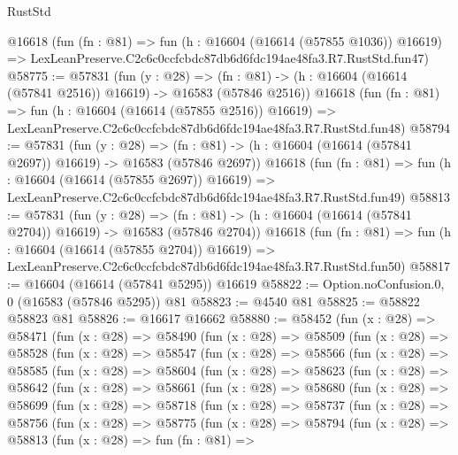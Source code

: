 \begin{lexlean}{RustStd}
\begin{coremodule}
    @16618
    (fun (fn : @81) =>
    fun (h : @16604 (@16614 (@57855 @1036)) @16619) =>
    LexLeanPreserve.C2c6c0ccfcbdc87db6d6fdc194ae48fa3.R7.RustStd.fun47)
@58775 := @57831
    (fun (y : @28) =>
    (fn : @81) -> (h : @16604 (@16614 (@57841 @2516)) @16619) -> @16583 (@57846 @2516))
    @16618
    (fun (fn : @81) =>
    fun (h : @16604 (@16614 (@57855 @2516)) @16619) =>
    LexLeanPreserve.C2c6c0ccfcbdc87db6d6fdc194ae48fa3.R7.RustStd.fun48)
@58794 := @57831
    (fun (y : @28) =>
    (fn : @81) -> (h : @16604 (@16614 (@57841 @2697)) @16619) -> @16583 (@57846 @2697))
    @16618
    (fun (fn : @81) =>
    fun (h : @16604 (@16614 (@57855 @2697)) @16619) =>
    LexLeanPreserve.C2c6c0ccfcbdc87db6d6fdc194ae48fa3.R7.RustStd.fun49)
@58813 := @57831
    (fun (y : @28) =>
    (fn : @81) -> (h : @16604 (@16614 (@57841 @2704)) @16619) -> @16583 (@57846 @2704))
    @16618
    (fun (fn : @81) =>
    fun (h : @16604 (@16614 (@57855 @2704)) @16619) =>
    LexLeanPreserve.C2c6c0ccfcbdc87db6d6fdc194ae48fa3.R7.RustStd.fun50)
@58817 := @16604 (@16614 (@57841 @5295)) @16619
@58822 := Option.noConfusion.{0, 0} (@16583 (@57846 @5295)) @81
@58823 := @4540 @81
@58825 := @58822 @58823 @81
@58826 := @16617 @16662
@58880 := @58452
    (fun (x : @28) =>
    @58471
      (fun (x : @28) =>
      @58490
        (fun (x : @28) =>
        @58509
          (fun (x : @28) =>
          @58528
            (fun (x : @28) =>
            @58547
              (fun (x : @28) =>
              @58566
                (fun (x : @28) =>
                @58585
                  (fun (x : @28) =>
                  @58604
                    (fun (x : @28) =>
                    @58623
                      (fun (x : @28) =>
                      @58642
                        (fun (x : @28) =>
                        @58661
                          (fun (x : @28) =>
                          @58680
                            (fun (x : @28) =>
                            @58699
                              (fun (x : @28) =>
                              @58718
                                (fun (x : @28) =>
                                @58737
                                  (fun (x : @28) =>
                                  @58756
                                    (fun (x : @28) =>
                                    @58775
                                      (fun (x : @28) =>
                                      @58794
                                        (fun (x : @28) =>
                                        @58813
                                          (fun (x : @28) =>
                                          fun (fn : @81) =>

\end{coremodule}
\end{lexlean}

